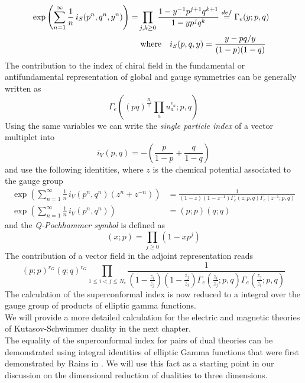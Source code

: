 \begin{align}
 \exp \left(  
\sum_{n=1}^{\infty} \frac{1}{n} \, i_S(p^n,q^n,y^n) \right)=
& \prod_{j,k \geq 0} \frac{1 - y^{-1}p^{j+1}q^{k+1}}{1 - y p^j q^k}
\overset{def}{=} 
\Gamma_e ( y; p, q) 
\\
& \; \hbox{where} \quad i_S(p,q,y) = \frac{y - pq/y}{(1-p)(1-q)} \quad
\end{align}
The contribution to the index of chiral field in the fundamental or antifundamental representation of global and gauge symmetries can be generally
 written as
\begin{equation}
\Gamma_e \left(   (pq)^{\frac{R_i}{2}} \prod_a u_a^{e_a} ; p ,q \right)
\end{equation}
Using the same variables we can write the \emph{single particle index} of a vector multiplet into
\begin{equation}
i_V(p,q) = - \left( \frac{p}{1-p} + \frac{q}{1-q} \right)
\end{equation}
and use the following identities, where $z$ is the chemical potential associated to the gauge group
\begin{align}
\exp \left(  
\sum_{n=1}^{\infty} \frac{1}{n}\, i_V(p^n,q^n) ( z^n + z^{-n}) \right) & = \frac{1}{(1-z)(1-z^{-1}) \Gamma_e(z;p,q) \Gamma_e(z^{-1};p,q)}
\\
\exp \left(
\sum_{n=1}^{\infty} \frac{1}{n} \, i_V(p^n,q^n) \right) & = (p;p) (q;q)
\end{align}
and the \emph{Q-Pochhammer symbol} is defined as
\begin{equation}
(x;p) = \prod_{j \geq 0} ( 1- x p^j)
\end{equation}
The contribution of a vector field in the adjoint representation reads
\begin{equation}
(p;p)^{r_G} (q;q)^{r_G} \prod_{1 \leq i < j \leq N_c} \frac{1}{(1-\frac{z_i}{z_j})(1-\frac{z_j}{z_i}) \Gamma_e(\frac{z_i}{z_j};p,q) \Gamma_e(\frac{z_j}{z_i};p,q)}
\end{equation}
The calculation of the superconformal index is now reduced to a integral over the gauge group of products of elliptic gamma functions.\\
We will provide a more detailed calculation for the electric and magnetic theories of Kutasov-Schwimmer duality in the next chapter.
\\
The equality of the superconformal index for pairs of dual theories can be demonstrated using integral identities of elliptic Gamma functions that were first demonstrated by Rains in \cite{rains309252transformations}.
We will use this fact as a starting point in our discussion on the dimensional reduction of dualities to three dimensions.








